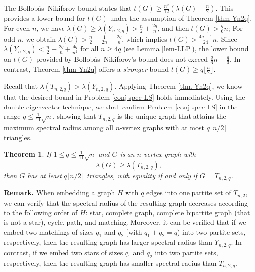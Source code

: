 \documentclass[11pt]{article}
\newtheorem{theorem}{Theorem}[section]
\begin{document}
The Bollob\'{a}s--Nikiforov bound  \cite{BN2007jctb} 
states that $t(G)\ge \frac{n^2}{12} \left( \lambda (G)- \frac{n}{2} \right)$.  This provides a lower bound for $t(G)$ under the assumption of Theorem \ref{thm-Yn2q}.  
For even $n$, we have $\lambda(G) \ge \lambda (Y_{n,2,q}) > \frac{n}{2} + \frac{2q}{n}$, and then $t(G) > \frac{q}{6}n$; For odd $n$, we obtain $\lambda(G) > \frac{n}{2}  - \frac{1}{2n}+ \frac{2q}{n}$, which implies $t(G) > \frac{4q-1}{24}n$. Since $\lambda(Y_{n,2,q}) < \frac{n}{2} + \frac{2q}{n} + \frac{4q}{n^2}$ for all $n\ge 4q$ (see Lemma \ref{lem-LLP}), the lower bound on $t(G)$ provided by Bollob\'{a}s--Nikiforov's bound does not exceed $\frac{q}{6}n + \frac{q}{3}$. In contrast, Theorem \ref{thm-Yn2q} offers a {\it stronger} bound $t(G) \geq q\lfloor \frac{n}{2} \rfloor$. 



\medskip 
Recall that $\lambda (T_{n,2,q}) > \lambda (Y_{n,2,q})$. 
Applying Theorem \ref{thm-Yn2q}, 
we know that the desired bound 
in Problem \ref{conj-spec-LS} holds 
immediately. 
Using the double-eigenvector technique, we shall confirm Problem  \ref{conj-spec-LS} in the range $q\le \frac{1}{11}\sqrt{n}$, 
showing that $T_{n,2,q}$ is the unique graph that 
attains the maximum spectral radius among all $n$-vertex 
graphs 
with at most $q\lfloor {n}/{2}\rfloor$ triangles. 

\begin{theorem} \label{thm-sp-LS}
If  $1\le q \le \frac{1}{11}\sqrt{n}$ and $G$ is an $n$-vertex graph with
\[  \lambda (G)\ge \lambda (T_{n,2,q}), \]  
then $G$ has at least  $ q \lfloor {n}/{2}\rfloor $ triangles, 
with equality if and only if $G=T_{n,2,q}$. 
\end{theorem}


\noindent 
{\bf Remark.}  When embedding  
a graph $H$ with $q$ edges into one partite set 
of $T_{n,2}$, we can verify that 
the spectral radius of the resulting graph 
decreases according to the following order of $H$: 
star, complete graph, complete bipartite graph (that is not a star), cycle, path, and matching. 
Moreover, it can be verified that 
if we embed two matchings of sizes $q_1$ and $q_2$ 
(with $q_1+q_2=q$) into two partite sets, respectively, 
then the resulting graph has larger spectral radius than 
 $Y_{n,2,q}$. In contrast, 
 if we embed two stars of sizes $q_1$ and 
$q_2$ into two partite sets, respectively, then 
the resulting graph has smaller spectral radius  than  
$T_{n,2,q}$. 
\end{document}
